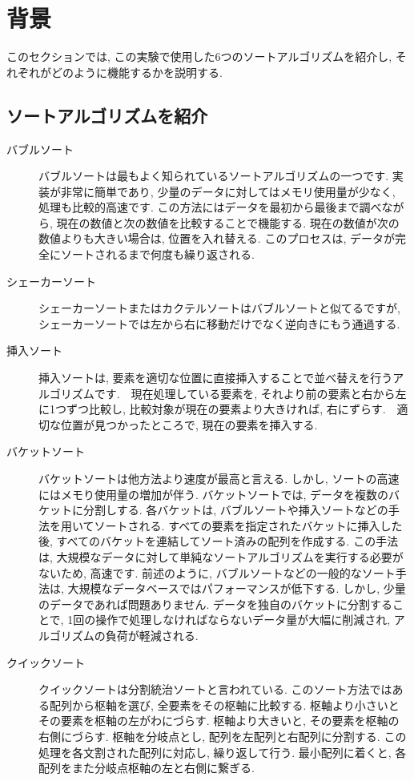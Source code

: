 \documentclass[a4j, 12pt]{jarticle}
\begin{document}
\section{背景}
このセクションでは, この実験で使用した6つのソートアルゴリズムを紹介し, それぞれがどのように機能するかを説明する.
\subsection{ソートアルゴリズムを紹介}
\begin{description}
  \item[バブルソート] バブルソートは最もよく知られているソートアルゴリズムの一つです. 実装が非常に簡単であり, 少量のデータに対してはメモリ使用量が少なく, 処理も比較的高速です. この方法にはデータを最初から最後まで調べながら, 現在の数値と次の数値を比較することで機能する. 現在の数値が次の数値よりも大きい場合は, 位置を入れ替える. このプロセスは, データが完全にソートされるまで何度も繰り返される.\\
  \item[シェーカーソート] シェーカーソートまたはカクテルソートはバブルソートと似てるですが, シェーカーソートでは左から右に移動だけでなく逆向きにもう通過する. \\
  \item[挿入ソート] 挿入ソートは, 要素を適切な位置に直接挿入することで並べ替えを行うアルゴリズムです.　現在処理している要素を, それより前の要素と右から左に1つずつ比較し, 比較対象が現在の要素より大きければ, 右にずらす.　適切な位置が見つかったところで, 現在の要素を挿入する. \\
  \item[バケットソート] バケットソートは他方法より速度が最高と言える. しかし, ソートの高速にはメモり使用量の増加が伴う. バケットソートでは, データを複数のバケットに分割しする. 各バケットは, バブルソートや挿入ソートなどの手法を用いてソートされる. すべての要素を指定されたバケットに挿入した後, すべてのバケットを連結してソート済みの配列を作成する. この手法は, 大規模なデータに対して単純なソートアルゴリズムを実行する必要がないため, 高速です. 前述のように, バブルソートなどの一般的なソート手法は, 大規模なデータベースではパフォーマンスが低下する. しかし, 少量のデータであれば問題ありません. データを独自のバケットに分割することで, 1回の操作で処理しなければならないデータ量が大幅に削減され, アルゴリズムの負荷が軽減される. \\
  \item[クイックソート] クイックソートは分割統治ソートと言われている. このソート方法ではある配列から枢軸を選び, 全要素をその枢軸に比較する. 枢軸より小さいとその要素を枢軸の左がわにづらす. 枢軸より大きいと, その要素を枢軸の右側にづらす. 枢軸を分岐点とし, 配列を左配列と右配列に分割する. この処理を各文割された配列に対応し, 繰り返して行う. 最小配列に着くと, 各配列をまた分岐点枢軸の左と右側に繋ぎる. \\

\end{description}
\end{document}
